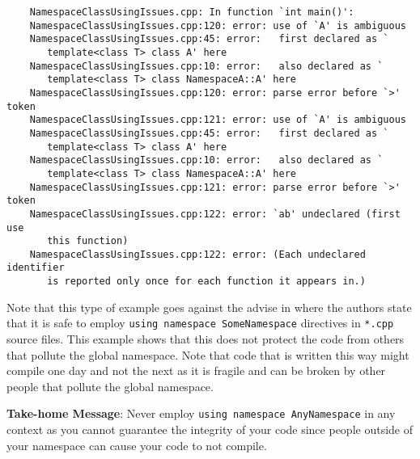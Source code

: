 \begin{enumerate}
{\begin{verbatim}
    NamespaceClassUsingIssues.cpp: In function `int main()':
    NamespaceClassUsingIssues.cpp:120: error: use of `A' is ambiguous
    NamespaceClassUsingIssues.cpp:45: error:   first declared as `
       template<class T> class A' here
    NamespaceClassUsingIssues.cpp:10: error:   also declared as `
       template<class T> class NamespaceA::A' here
    NamespaceClassUsingIssues.cpp:120: error: parse error before `>' token
    NamespaceClassUsingIssues.cpp:121: error: use of `A' is ambiguous
    NamespaceClassUsingIssues.cpp:45: error:   first declared as `
       template<class T> class A' here
    NamespaceClassUsingIssues.cpp:10: error:   also declared as `
       template<class T> class NamespaceA::A' here
    NamespaceClassUsingIssues.cpp:121: error: parse error before `>' token
    NamespaceClassUsingIssues.cpp:122: error: `ab' undeclared (first use 
       this function)
    NamespaceClassUsingIssues.cpp:122: error: (Each undeclared identifier 
       is reported only once for each function it appears in.)
\end{verbatim}}

Note that this type of example goes against the advise in {}\cite[Item
59]{C++CodingStandards05} where the authors state that it is safe to
employ {}\texttt{using namespace SomeNamespace} directives in
{}\texttt{*.cpp} source files.  This example shows that this does not
protect the code from others that pollute the global namespace.  Note
that code that is written this way might compile one day and not the
next as it is fragile and can be broken by other people that pollute
the global namespace.

{}\textbf{Take-home Message}: Never employ {}\texttt{using namespace
AnyNamespace} in any context as you cannot guarantee the integrity of
your code since people outside of your namespace can cause your code
to not compile.

\end{enumerate}
